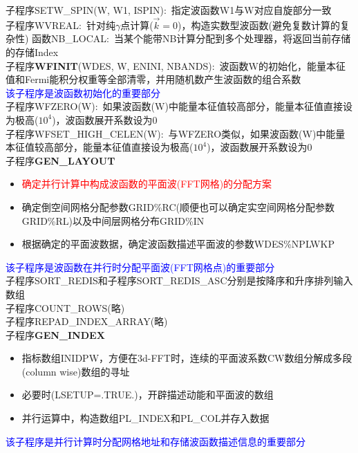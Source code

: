 子程序\textrm{SETW\_SPIN(W, W1, ISPIN)}:~指定波函数\textrm{W1}与\textrm{W}对应自旋部分一致\\
子程序\textrm{WVREAL}:~针对纯$\gamma$点计算($\vec k=0$)，构造实数型波函数(避免复数计算的复杂性)
函数\textrm{NB\_LOCAL}:~当某个能带\textrm{NB}计算分配到多个处理器，将返回当前存储的存储\textrm{Index}\\
{\hei 子程序}\textbf{WFINIT}\textrm{(WDES, W, ENINI, NBANDS)}:~波函数\textrm{W}的初始化，能量本征值和\textrm{Fermi}能积分权重等全部清零，并用随机数产生波函数的组合系数\\
\textcolor{blue}{该子程序是波函数初始化的重要部分}\\
子程序\textrm{WFZERO(W)}:~如果波函数(\textrm{W})中能量本征值较高部分，能量本征值直接设为极高($10^4$)，波函数展开系数设为0\\
子程序\textrm{WFSET\_HIGH\_CELEN(W)}:~与\textrm{WFZERO}类似，如果波函数(\textrm{W})中能量本征值较高部分，能量本征值直接设为极高($10^4$)，波函数展开系数设为0\\
{\hei 子程序}\textbf{GEN\_LAYOUT}
\begin{itemize}
	\item \textcolor{red}{确定并行计算中构成波函数的平面波(\textrm{FFT}网格)的分配方案}
	\item 确定倒空间网格分配参数\textrm{GRID\%RC}(顺便也可以确定实空间网格分配参数\textrm{GRID\%RL})以及中间层网格分布\textrm{GRID\%IN}
	\item 根据确定的平面波数据，确定波函数描述平面波的参数\textrm{WDES\%NPLWKP}
\end{itemize}
\textcolor{blue}{该子程序是波函数在并行时分配平面波(\textrm{FFT}网格点)的重要部分}\\
子程序\textrm{SORT\_REDIS}和子程序\textrm{SORT\_REDIS\_ASC}分别是按降序和升序排列输入数组\\
子程序\textrm{COUNT\_ROWS}(略)\\
子程序\textrm{REPAD\_INDEX\_ARRAY}(略)\\
{\hei 子程序}\textbf{GEN\_INDEX}
\begin{itemize}
	\item 指标数组\textrm{INIDPW}，方便在\textrm{3d-FFT}时，连续的平面波系数\textrm{CW}数组分解成多段\textrm{(column wise)}数组的寻址
	\item 必要时(\textrm{LSETUP=.TRUE.})，开辟描述动能和平面波的数组
	\item 并行运算中，构造数组\textrm{PL\_INDEX}和\textrm{PL\_COL}并存入数据
\end{itemize}
\textcolor{blue}{该子程序是并行计算时分配网格地址和存储波函数描述信息的重要部分}

